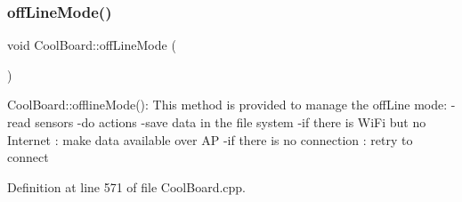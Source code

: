 \subsubsection{\texorpdfstring{off\+Line\+Mode()}{offLineMode()}}
{\footnotesize\ttfamily void Cool\+Board\+::off\+Line\+Mode (\begin{DoxyParamCaption}{ }\end{DoxyParamCaption})}

Cool\+Board\+::offline\+Mode()\+: This method is provided to manage the off\+Line mode\+: -\/read sensors -\/do actions -\/save data in the file system -\/if there is Wi\+Fi but no Internet \+: make data available over AP -\/if there is no connection \+: retry to connect 

Definition at line 571 of file Cool\+Board.\+cpp.


